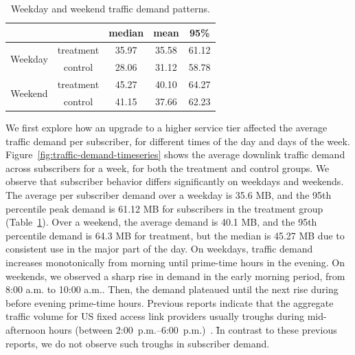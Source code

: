 \begin{table}[t]
\centering
\begin{tabular}{ cc | ccc }\\\hline
                         &           & median & mean  & 95\%  \\\hline
\multirow{2}{*}{Weekday} & treatment & 35.97  & 35.58 & 61.12 \\
                         & control   & 28.06  & 31.12 & 58.78 \\\hline
\multirow{2}{*}{Weekend} & treatment & 45.27  & 40.10 & 64.27 \\
                         & control   & 41.15  & 37.66 & 62.23 \\\hline
\end{tabular}
\caption{Weekday and weekend traffic demand patterns.}
\label{tab:traffic-demand-description}
\end{table}

We first explore how an upgrade to a higher service tier affected the
average traffic demand per subscriber, for different times of the day
and days of the week.  Figure~\ref{fig:traffic-demand-timeseries} shows
the average downlink traffic demand across subscribers for a week, for
both the treatment and control groups. We observe that subscriber
behavior differs significantly on weekdays and weekends.  The average
per subscriber demand over a weekday is 35.6 MB, and the 95th percentile
peak demand is 61.12 MB for subscribers in the treatment group
(Table~\ref{tab:traffic-demand-description}).  Over a weekend, the
average demand is 40.1 MB, and the 95th percentile demand is 64.3 MB for
treatment, but the median is 45.27 MB due to consistent use in the major
part of the day.  On weekdays, traffic demand increases monotonically
from morning until prime-time hours in the evening. On weekends, we
observed a sharp rise in demand in the early morning period, from 8:00
a.m. to 10:00 a.m.. Then, the demand plateaued until the next rise
during before evening prime-time hours. Previous reports indicate that
the aggregate traffic volume for US fixed access link providers usually
troughs during mid-afternoon hours (between
2:00~p.m.--6:00~p.m.)~\cite{sandvine20141h}. \f{In contrast to these
  previous reports, we do not observe such troughs in 
subscriber demand.}

